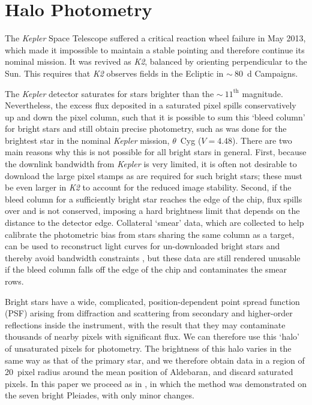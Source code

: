 \documentclass[modern]{aastex61}
\newcommand{\kepler}{\emph{Kepler}\xspace}
\newcommand{\ktwo}{\emph{K2}\xspace}
\begin{document}
\appendix

\section{Halo Photometry}
\label{halo}

The \kepler Space Telescope \citep{2010sci...327..977b}  
suffered a critical reaction wheel failure in May 2013, which made it impossible to maintain a stable pointing and therefore continue its nominal mission. It was revived as \ktwo \citep{howell14}, balanced by orienting perpendicular to the Sun. This requires that \ktwo observes fields in the Ecliptic in $\sim~80$~d Campaigns. 

The \kepler detector saturates for stars brighter than the $\sim~11^\text{th}$ magnitude. Nevertheless, the excess flux deposited in a saturated pixel spills conservatively up and down the pixel column, such that it is possible to sum this `bleed column' for bright stars and still obtain precise photometry, such as was done for the brightest star in the nominal \kepler mission, $\theta$~Cyg \citep{guzik2011,thetacygwhite,guzik2016} ($V = 4.48$). There are two main reasons why this is not possible for all bright stars in general. First, because the downlink bandwidth from \kepler is very limited, it is often not desirable to download the large pixel stamps as are required for such bright stars; these must be even larger in \ktwo to account for the reduced image stability. Second, if the bleed column for a sufficiently bright star reaches the edge of the chip, flux spills over and is not conserved, imposing a hard brightness limit that depends on the distance to the detector edge. 
Collateral `smear' data, which are collected to help calibrate the photometric bias from stars sharing the same column as a target, can be used to reconstruct light curves for un-downloaded bright stars and thereby avoid bandwidth constraints \citep{k2smear}, but these data are still rendered unusable if the bleed column falls off the edge of the chip and contaminates the smear rows.

Bright stars have a wide, complicated, position-dependent point spread function (PSF) arising from diffraction and scattering from secondary and higher-order reflections inside the instrument, with the result that they may contaminate thousands of nearby pixels with significant flux. We can therefore use this `halo' of unsaturated pixels for photometry. The brightness of this halo varies in the same way as that of the primary star, and we therefore obtain data in a region of 20~pixel radius around the mean position of Aldebaran, and discard saturated pixels.
In this paper we proceed as in \citet{White2017}, in which the method was demonstrated on the seven bright Pleiades, with only minor changes.
\end{document}
